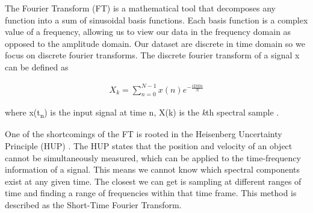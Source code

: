 \documentclass{turabian-thesis}[12pt]
\begin{document}

The Fourier Transform (FT) is a mathematical tool that decomposes any function into a sum of sinusoidal basis functions. Each basis function is a complex value of a frequency, allowing us to view our data in the frequency domain as opposed to the amplitude domain. Our dataset are discrete in time domain so we focus on discrete fourier transforms. The discrete fourier transform of a signal x can be defined as 

\begin{equation} \label{eq1}
   \begin{split}
      X_{k} =  \sum_{n=0}^{N-1} x(n) e^{-\frac{i2\pi kn}{N}}
   \end{split}
\end{equation}

where x(t\textsubscript{n}) is the input signal at time n, X(k) is the \textit{k}th spectral sample \cite{smith_mathematics_nodate}.



One of the shortcomings of the FT is rooted in the Heisenberg Uncertainty Principle (HUP) \cite{hill_uncertainty_nodate}.  The HUP states that the position and velocity of an object cannot be simultaneously measured, which can be applied to the time-frequency information of a signal. This means we cannot know which spectral components exist at any given time. The closest we can get is sampling at different ranges of time and finding a range of frequencies within that time frame. This method is described as the Short-Time Fourier Transform.




\end{document}
